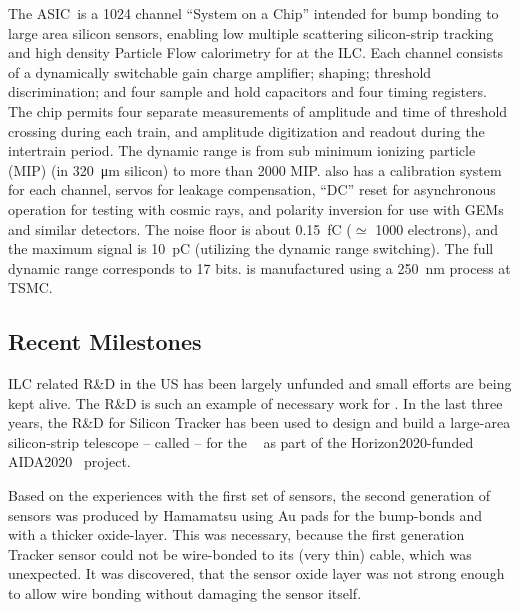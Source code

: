 The \KPIX ASIC~\cite{6551433}is a 1024 channel ``System on a Chip'' intended for bump bonding 
to large area silicon sensors, enabling low multiple scattering silicon-strip 
tracking and high density Particle Flow calorimetry for \SID at the ILC. 
Each channel consists of a dynamically switchable gain charge amplifier; 
shaping; threshold discrimination; and four sample and hold 
capacitors and four timing registers. The chip permits four  separate measurements of 
amplitude and time of threshold crossing during each train, and amplitude 
digitization and readout during the intertrain period. The dynamic range is from 
sub minimum ionizing particle (MIP) (in \SI{320}{\micro\meter} silicon) to more 
than 2000 MIP. \KPIX also has a calibration system for each channel, servos for 
leakage compensation, ``DC'' reset for asynchronous operation for testing with 
cosmic rays, and polarity inversion for use with GEMs and similar detectors. The 
noise floor is about \SI{0.15}{fC} ($\simeq$ 1000 electrons), and the maximum 
signal is \SI{10}{pC} (utilizing the dynamic range switching). The full dynamic 
range corresponds to 17 bits. \KPIX is manufactured using a \SI{250}{\nano\meter} process at TSMC.

\subsection{Recent Milestones}
ILC related R\&D in the US has been largely unfunded and small efforts are being kept alive. The \KPIX R\&D is such an example of necessary work for \SID.
In the last three years, the R\&D for \KPIX Silicon Tracker has been used to design and build a large-area silicon-strip 
telescope -- called \LYCORIS -- for the \DIITBF~\cite{desytb2018} as part of the Horizon2020-funded AIDA2020~\cite{AIDA2020} project.

Based on the experiences with the first set of sensors, the second generation of sensors was produced by Hamamatsu 
using Au pads for the \KPIX bump-bonds and with a thicker oxide-layer. This was necessary, because the first generation Tracker sensor could not be 
wire-bonded to its (very thin) cable, which was unexpected. It was discovered, that the sensor oxide layer was not strong enough 
to allow wire bonding without damaging the sensor itself.



